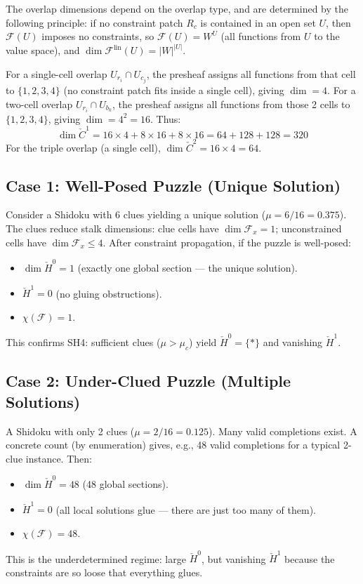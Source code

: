 \documentclass[11pt,letterpaper]{article}
\newcommand{\Cech}{\check{C}}
\newcommand{\Hcech}{\check{H}}
\newcommand{\sheaf}{\mathcal{F}}
\begin{document}
The overlap dimensions depend on the overlap type, and are 
determined by the following principle: if no constraint patch 
$R_c$ is contained in an open set $U$, then $\sheaf(U)$ imposes 
no constraints, so $\sheaf(U) = W^U$ (all functions from $U$ to 
the value space), and $\dim \sheaf^{\mathrm{lin}}(U) = |W|^{|U|}$.

For a single-cell 
overlap $U_{r_i} \cap U_{c_j}$, the presheaf assigns all functions 
from that cell to $\{1,2,3,4\}$ (no constraint patch fits inside a 
single cell), giving $\dim = 4$. For a two-cell overlap 
$U_{r_i} \cap U_{b_k}$, the presheaf assigns all functions from 
those 2 cells to $\{1,2,3,4\}$, giving $\dim = 4^2 = 16$. Thus:
\[
    \dim \Cech^1 = 16 \times 4 + 8 \times 16 + 8 \times 16 
    = 64 + 128 + 128 = 320
\]
For the triple overlap (a single cell), $\dim \Cech^2 = 16 \times 4 
= 64$.

\subsection{Case 1: Well-Posed Puzzle (Unique Solution)}

Consider a Shidoku with 6 clues yielding a unique solution 
($\mu = 6/16 = 0.375$). The clues reduce stalk dimensions: clue 
cells have $\dim \sheaf_x = 1$; unconstrained cells have 
$\dim \sheaf_x \leq 4$. After constraint propagation, if the 
puzzle is well-posed:
\begin{itemize}
    \item $\dim \Hcech^0 = 1$ (exactly one global section --- the 
    unique solution).
    \item $\Hcech^1 = 0$ (no gluing obstructions).
    \item $\chi(\sheaf) = 1$.
\end{itemize}
This confirms SH4: sufficient clues ($\mu > \mu_c$) yield 
$\Hcech^0 = \{*\}$ and vanishing $\Hcech^1$.

\subsection{Case 2: Under-Clued Puzzle (Multiple Solutions)}

A Shidoku with only 2 clues ($\mu = 2/16 = 0.125$). Many valid 
completions exist. A concrete count (by enumeration) gives, e.g., 
48 valid completions for a typical 2-clue instance. Then:
\begin{itemize}
    \item $\dim \Hcech^0 = 48$ (48 global sections).
    \item $\Hcech^1 = 0$ (all local solutions glue --- there are 
    just too many of them).
    \item $\chi(\sheaf) = 48$.
\end{itemize}
This is the underdetermined regime: large $\Hcech^0$, but vanishing 
$\Hcech^1$ because the constraints are so loose that everything glues.
\end{document}
